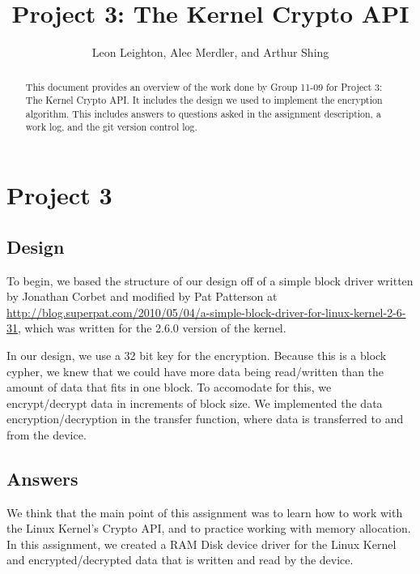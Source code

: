 \documentclass[journal, letterpaper, draftclsnofoot, onecolumn, 10pt]{IEEEtran}
\begin{document}
\title{Project 3: The Kernel Crypto API}
\author{Leon Leighton, Alec Merdler, and Arthur Shing}

\begin{titlepage}
    \centering
    \maketitle
    \begin{abstract}
      This document provides an overview of the work done by Group 11-09 for Project 3: The Kernel Crypto API.
      It includes the design we used to implement the encryption algorithm.
      This includes answers to questions asked in the assignment description, a work log, and the git version control log.
    \end{abstract}


\end{titlepage}
\tableofcontents
\clearpage

\section{Project 3}

\subsection{Design}
To begin, we based the structure of our design off of a simple block driver written by Jonathan Corbet and modified by Pat Patterson at \url{http://blog.superpat.com/2010/05/04/a-simple-block-driver-for-linux-kernel-2-6-31}, which was written for the 2.6.0 version of the kernel.

In our design, we use a 32 bit key for the encryption. Because this is a block cypher, we knew that we could have more data being read/written
than the amount of data that fits in one block. To accomodate for this, we encrypt/decrypt data in increments of block size.
We implemented the data encryption/decryption in the transfer function, where data is transferred to and from the device. \\


\subsection{Answers}


We think that the main point of this assignment was to learn how to work with the Linux Kernel's Crypto API, and to practice working with memory allocation.
In this assignment, we created a RAM Disk device driver for the Linux Kernel and encrypted/decrypted data that is written and read by the device. \\
\end{document}
